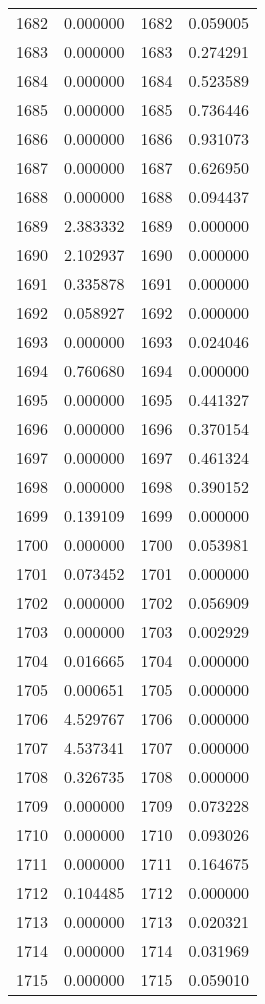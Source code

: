 \documentclass[12pt]{article}
\begin{document}
\begin{longtable}{@{}cccc@{}}
1682 & 0.000000 & 1682 & 0.059005 \\
1683 & 0.000000 & 1683 & 0.274291 \\
1684 & 0.000000 & 1684 & 0.523589 \\
1685 & 0.000000 & 1685 & 0.736446 \\
1686 & 0.000000 & 1686 & 0.931073 \\
1687 & 0.000000 & 1687 & 0.626950 \\
1688 & 0.000000 & 1688 & 0.094437 \\
1689 & 2.383332 & 1689 & 0.000000 \\
1690 & 2.102937 & 1690 & 0.000000 \\
1691 & 0.335878 & 1691 & 0.000000 \\
1692 & 0.058927 & 1692 & 0.000000 \\
1693 & 0.000000 & 1693 & 0.024046 \\
1694 & 0.760680 & 1694 & 0.000000 \\
1695 & 0.000000 & 1695 & 0.441327 \\
1696 & 0.000000 & 1696 & 0.370154 \\
1697 & 0.000000 & 1697 & 0.461324 \\
1698 & 0.000000 & 1698 & 0.390152 \\
1699 & 0.139109 & 1699 & 0.000000 \\
1700 & 0.000000 & 1700 & 0.053981 \\
1701 & 0.073452 & 1701 & 0.000000 \\
1702 & 0.000000 & 1702 & 0.056909 \\
1703 & 0.000000 & 1703 & 0.002929 \\
1704 & 0.016665 & 1704 & 0.000000 \\
1705 & 0.000651 & 1705 & 0.000000 \\
1706 & 4.529767 & 1706 & 0.000000 \\
1707 & 4.537341 & 1707 & 0.000000 \\
1708 & 0.326735 & 1708 & 0.000000 \\
1709 & 0.000000 & 1709 & 0.073228 \\
1710 & 0.000000 & 1710 & 0.093026 \\
1711 & 0.000000 & 1711 & 0.164675 \\
1712 & 0.104485 & 1712 & 0.000000 \\
1713 & 0.000000 & 1713 & 0.020321 \\
1714 & 0.000000 & 1714 & 0.031969 \\
1715 & 0.000000 & 1715 & 0.059010 \\

\end{longtable}
\end{document}
